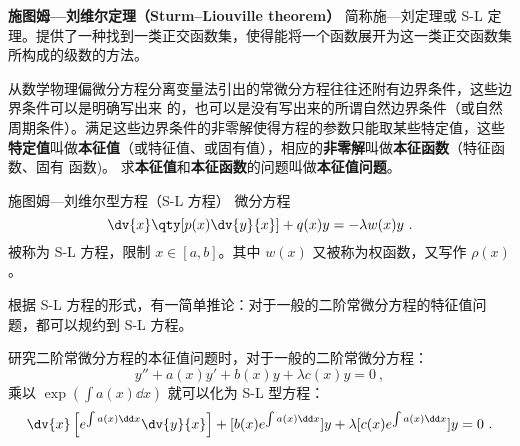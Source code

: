 
\begin{issues}
\issueDraft
{}
\end{issues}





\textbf{施图姆—刘维尔定理（Sturm–Liouville theorem）} 简称施—刘定理或 S-L 定理。提供了一种找到一类正交函数集，使得能将一个函数展开为这一类正交函数集所构成的级数的方法。

\begin{definition}{}
从数学物理偏微分方程分离变量法引出的常微分方程往往还附有边界条件，这些边界条件可以是明确写出来 的，也可以是没有写出来的所谓自然边界条件（或自然周期条件）。满足这些边界条件的非零解使得方程的参数只能取某些特定值，这些\textbf{特定值}叫做\textbf{本征值}（或特征值、或固有值），相应的\textbf{非零解}叫做\textbf{本征函数}（特征函数、固有 函数)。
求\textbf{本征值}和\textbf{本征函数}的问题叫做\textbf{本征值问题}。
\end{definition}

\begin{definition}{施图姆—刘维尔型方程（S-L 方程）}
微分方程
\begin{equation}\label{eq_SLthrm_1}
\dv{x}\qty[p(x)\dv{y}{x}] + q(x) y = -\lambda w(x) y~.
\end{equation}
被称为 S-L 方程，限制 $x \in [a, b]$。其中 $w(x)$ 又被称为权函数，又写作 $\rho(x)$。
\end{definition}

根据 S-L 方程的形式，有一简单推论：对于一般的二阶常微分方程的特征值问题，都可以规约到 S-L 方程。
\begin{corollary}{}
研究二阶常微分方程的本征值问题时，对于一般的二阶常微分方程：
$$y'' + a(x) y' +b(x) y + \lambda c(x) y = 0 ~,$$
乘以 $\exp(\int a(x) \dd x)$ 就可以化为 S-L 型方程：
$$\dv{x} \left[e^{\int a(x) \dd x} \dv{y}{x}\right]  + [b(x) e^{\int a(x) \dd x}]y +\lambda[c(x) e^{\int a(x) \dd x}] y = 0~.$$
\end{corollary}

